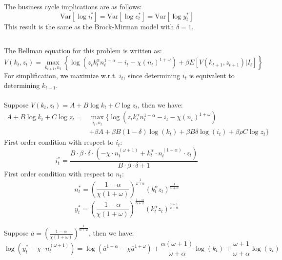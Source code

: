 \documentclass{article}
\begin{document}
The business cycle implications are as follows:
\begin{equation}
    \mathrm{Var}[\log i_t^*] = \mathrm{Var}[\log c_t^*] = \mathrm{Var}[\log y_t^*]
\end{equation}
This result is the same as the Brock-Mirman model with \(\delta = 1\).

\subsection{}
The Bellman equation for this problem is written as:
\begin{equation}
    V(k_t, z_t) = \max_{k_{t+1}, n_t} \left\{ \log\left(z_t k_t^\alpha n_t^{1-\alpha}-i_t-\chi (n_t)^{1+\omega}\right) + \beta E[V(k_{t+1}, z_{t+1}) | I_t] \right\}
\end{equation}
For simplification, we maximize w.r.t. \(i_t\), since determining \(i_t\) is equivalent to determining \(k_{t+1}\). \\ \\
Suppose \(V(k_t, z_t) = A + B \log k_t + C \log z_t\), then we have:
\begin{align*}
    A +  B \log k_t + C \log z_t = & \max_{i_{t}, n_t} \{ \log\left(z_t k_t^\alpha n_t^{1-\alpha}-i_t-\chi (n_t)^{1+\omega}\right) \\
    &  + \beta A + \beta B (1-\delta) \log (k_{t}) + \beta B \delta \log(i_t) + \beta \rho C \log z_{t} \}
\end{align*}
First order condition with respect to \(i_t\):\\
\begin{equation}
    i_t^* = \frac{{B \cdot \beta \cdot \delta \cdot (-\chi \cdot n_t^{(\omega + 1)} + k_t^{\alpha} \cdot n_t^{(1 - \alpha)} \cdot z_t)}}{{B \cdot \beta \cdot \delta + 1}}
\end{equation}
First order condition with respect to \(n_t\):\\
\begin{equation}
    n_t^* = \left(\frac{1-\alpha}{\chi (1+\omega)}\right)^{\frac{1}{\omega + \alpha}} \left(k_t^\alpha z_t\right)^{\frac{1}{\omega + \alpha}}
\end{equation}
\begin{equation}
    y_t^* = \left(\frac{1-\alpha}{\chi (1+\omega)}\right)^{\frac{1-\alpha}{\alpha + \omega}} \left(k_t^\alpha z_t\right)^{\frac{\omega + 1}{\omega + \alpha}}
\end{equation}

Suppose \(\overline{a} = \left(\frac{1-\alpha}{\chi (1+\omega)}\right)^{\frac{1}{\alpha + \omega}}\), then we have:
\begin{equation}
\log(y_t^* -\chi \cdot n_t^{(\omega + 1)}) = \log\left(\overline{a}^{1-\alpha} - \chi \overline{a}^{1+\omega}\right)+ \frac{\alpha(\omega + 1)}{\omega + \alpha} \log (k_{t}) + \frac{\omega + 1}{\omega + \alpha} \log(z_t)
\end{equation}
\end{document}
